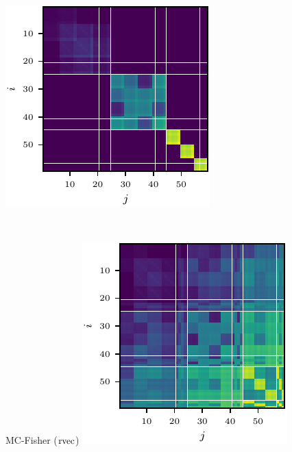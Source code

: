 \begin{figure}[!h]
\begin{minipage}[t]{0.485\linewidth}
    \includegraphics[width=\linewidth]{../kfs/plots/synthetic_rvec_ggn_kfac.pdf}
  \end{minipage}
  \\
  \begin{minipage}[t]{0.485\linewidth}
    \centering
    MC-Fisher ($\operatorname{rvec}$)\vspace{1ex}
    \includegraphics[width=\linewidth]{../kfs/plots/synthetic_rvec_mcfisher_100_full.pdf}

\end{minipage}
\end{figure}
